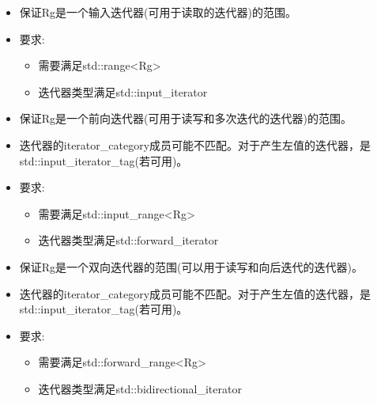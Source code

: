 
\begin{itemize}
\item
保证Rg是一个输入迭代器(可用于读取的迭代器)的范围。

\item
要求:

\begin{itemize}
\item
需要满足std::range<Rg>

\item
迭代器类型满足std::input\_iterator
\end{itemize}
\end{itemize}


\begin{itemize}
\item
保证Rg是一个前向迭代器(可用于读写和多次迭代的迭代器)的范围。

\item
迭代器的iterator\_category成员可能不匹配。对于产生左值的迭代器，是std::input\_iterator\_tag(若可用)。

\item
要求:

\begin{itemize}
\item
需要满足std::input\_range<Rg>

\item
迭代器类型满足std::forward\_iterator
\end{itemize}
\end{itemize}


\begin{itemize}
\item
保证Rg是一个双向迭代器的范围(可以用于读写和向后迭代的迭代器)。

\item
迭代器的iterator\_category成员可能不匹配。对于产生左值的迭代器，是std::input\_iterator\_tag(若可用)。

\item
要求:

\begin{itemize}
\item
需要满足std::forward\_range<Rg>

\item
迭代器类型满足std::bidirectional\_iterator
\end{itemize}
\end{itemize}


